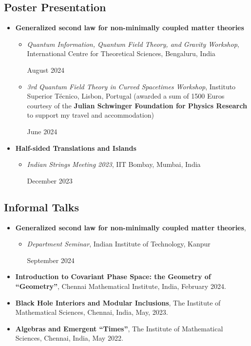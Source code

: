 \documentclass[11pt, letterpaper]{article}
\newcommand{\entry}[4]{
	\ifthenelse{\isempty{#3}}
	{\slimentry{#1}{#2}}{
		\begin{minipage}[t]{.25\linewidth}
			\hfill \textsc{#1}
		\end{minipage}
		\hfill \vline \hfill
		\begin{minipage}[t]{.7\linewidth}
			{\bf #2} \\ \textsf{#3} \\ \footnotesize{#4}
		\end{minipage}\\
		\vspace{.2cm}
}}
\newcommand{\slimentry}[2]{
	\begin{minipage}[t]{.25\linewidth}
		\hfill \textsc{#1}
	\end{minipage}
	\hfill \vline \hfill
	\begin{minipage}[t]{.7\linewidth}
		#2
	\end{minipage}\\
	\vspace{.25cm}
}%
\newcommand{\colentry}[2]{
	\begin{minipage}[t]{.75\linewidth}
		#1
	\end{minipage}
	\hfill
	\begin{minipage}[t]{.2\linewidth}
		\hfill #2
	\end{minipage}
}%
\newcommand{\imsc}{The Institute of Mathematical Sciences, Chennai}
\begin{document}
	\subsection{Poster Presentation}
	\begin{itemize}
		\item \textbf{Generalized second law for non-minimally coupled matter theories}
		\begin{itemize}
			\item \colentry{\emph{Quantum Information, Quantum Field Theory, and Gravity Workshop}, International Centre for Theoretical Sciences, Bengaluru, India}{August 2024}
			\item \colentry{\emph{3rd Quantum Field Theory in Curved Spacetimes Workshop}, Instituto Superior T\'ecnico, Lisbon, Portugal (awarded a sum of 1500 Euros courtesy of the \textbf{Julian Schwinger Foundation for Physics Research} to support my travel and accommodation)}{June 2024}
		\end{itemize}
		
		\item \textbf{Half-sided Translations and Islands} 
		\begin{itemize}
			\item \colentry{\emph{Indian Strings Meeting 2023}, IIT Bombay, Mumbai, India}{December 2023}
		\end{itemize}
	\end{itemize}
	
	\subsection{Informal Talks}
	\begin{itemize}
		\item \textbf{Generalized second law for non-minimally coupled matter theories},
		\begin{itemize}
			\item \colentry{\emph{Department Seminar}, Indian Institute of Technology, Kanpur}{September 2024}
		\end{itemize}
		
		\item \textbf{Introduction to Covariant Phase Space: the Geometry of ``Geometry''}, Chennai Mathematical Institute, India, February 2024.
		
		\item \textbf{Black Hole Interiors and Modular Inclusions}, \imsc, India, May, 2023.
		
		\item \textbf{Algebras and Emergent ``Times''}, \imsc, India, May 2022.
	\end{itemize}
	
\end{document}
